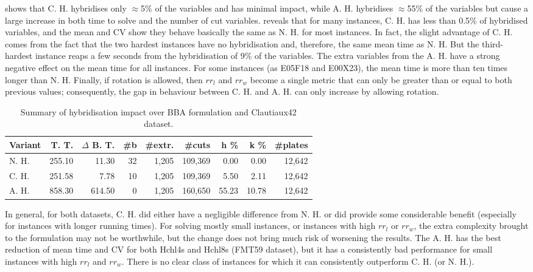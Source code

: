 \documentclass[ppgc,tese,english,formais,babel]{iiufrgs}
\begin{document}
 shows that C. H. hybridises only \(\approx\)5\% of the variables and has minimal impact, while A. H. hybridises \(\approx\)55\% of the variables but cause a large increase in both time to solve and the number of cut variables.
 reveals that for many instances, C. H. has less than 0.5\% of hybridised variables, and the mean and CV show they behave basically the same as N. H. for most instances.
In fact, the slight advantage of C. H. comes from the fact that the two hardest instances have no hybridisation and, therefore, the same mean time as N. H.
But the third-hardest instance reaps a few seconds from the hybridisation of 9\% of the variables.
The extra variables from the A. H. have a strong negative effect on the mean time for all instances.
For some instances (as E05F18 and E00X23), the mean time is more than ten times longer than N. H.
Finally, if rotation is allowed, then \(rr_l\) and \(rr_w\) become a single metric that can only be greater than or equal to both previous values; consequently, the gap in behaviour between C. H. and A. H. can only increase by allowing rotation.

\begin{table}[!ht]
\caption{Summary of hybridisation impact over BBA formulation and Clautiaux42 dataset.}
\label{tab:g2opp_hyb_summary}
\begin{center}
\begin{tabular}{lrrrrrrrr}
\hline\hline
\textbf{Variant} & \textbf{T. T.} & \textbf{\(\Delta\) B. T.} & \textbf{\#b} & \textbf{\#extr.} &\textbf{\#cuts} & \textbf{h \%} & \textbf{k \%} & \textbf{\#plates} \\\hline
N. H. & 255.10 & 11.30 & 32 & 1,205 & 109,369 & 0.00 & 0.00 & 12,642 \\
C. H. & 251.58 & 7.78 & 10 & 1,205 & 109,369 & 5.50 & 2.11 & 12,642 \\
A. H. & 858.30 & 614.50 & 0 & 1,205 & 160,650 & 55.23 & 10.78 & 12,642 \\\hline\hline
\end{tabular}
\end{center}
\end{table}

In general, for both datasets, C. H. did either have a negligible difference from N. H. or did provide some considerable benefit (especially for instances with longer running times).
For solving mostly small instances, or instances with high \(rr_l\) or \(rr_w\), the extra complexity brought to the formulation may not be worthwhile, but the change does not bring much risk of worsening the results.
The A. H. has the best reduction of mean time and CV for both Hchl4s and Hchl8s (FMT59 dataset), but it has a consistently bad performance for small instances with high \(rr_l\) and \(rr_w\).
There is no clear class of instances for which it can consistently outperform C. H. (or N. H.).
\end{document}
